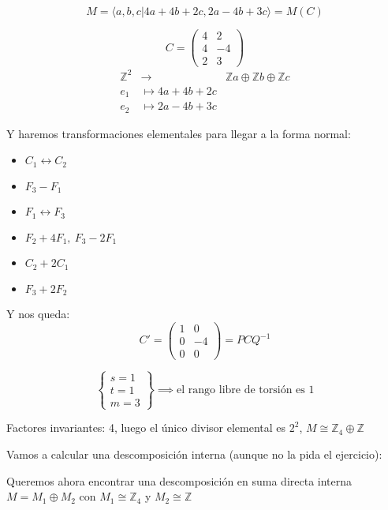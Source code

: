 \documentclass[openany]{book}
\begin{document}
\begin{exercise}
    $$ M = \langle a,b,c | 4a+4b+2c, 2a-4b+3c \rangle = M(C)  $$

    $$ C = \begin{pmatrix} 4 & 2\\ 4 & -4 \\ 2 & 3 \end{pmatrix}  $$
    $$ 
    \begin{aligned}
        \mathbb{Z}^2 & \to & \mathbb{Z}a \oplus \mathbb{Z}b \oplus \mathbb{Z}c\\ 
        e_1 & \mapsto 4a + 4b + 2c\\ 
        e_2 & \mapsto 2a-4b+3c
    \end{aligned}
    $$

    Y haremos transformaciones elementales para llegar a la forma normal:
    \begin{itemize}
        \item $ C_1 \leftrightarrow C_2$
        \item $ F_3-F_1$
        \item $ F_1 \leftrightarrow F_3$
        \item $ F_2+4F_1,\ F_3-2F_1$
        \item $ C_2+2C_1$
        \item $ F_3+2F_2$
    \end{itemize}

    Y nos queda:
    $$ C' =  \begin{pmatrix} 
    1 & 0 \\
    0 & -4 \\ 
    0 & 0
    \end{pmatrix} = P C Q ^{-1} $$

    $$ \left\{
    \begin{array}{l}
        s = 1\\ t = 1\\ m = 3
    \end{array}
    \right\} \implies \text{el rango libre de torsión es 1} $$

    Factores invariantes: 4, luego el único divisor elemental es $ 2^2$, $ M \cong \mathbb{Z}_{4}\oplus \mathbb{Z}$

    Vamos a calcular una descomposición interna (aunque no la pida el ejercicio):

    Queremos ahora encontrar una descomposición en suma directa interna $ M = M_1 \oplus M_2$ con $ M_1 \cong \mathbb{Z}_{4}$ y $ M_2 \cong \mathbb{Z}$


\end{exercise}
\end{document}
